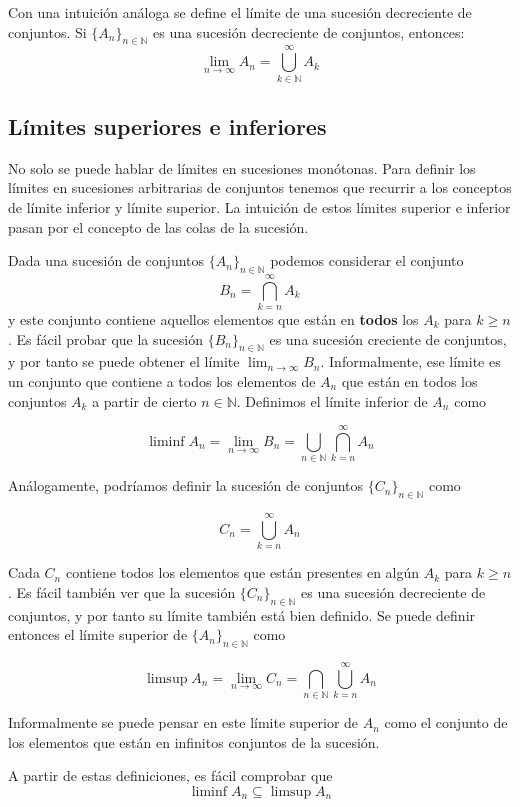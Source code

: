 \documentclass[12pt,a4paper,openright]{book}
\begin{document}
Con una intuición análoga se define el límite de una sucesión decreciente de conjuntos. Si $\{A_n\}_{n\in\mathbb{N}}$ es una sucesión decreciente de conjuntos, entonces:
$$ \lim_{n\to\infty} A_n = \bigcup_{k\in\mathbb{N}}^{\infty} A_k $$

\subsection{Límites superiores e inferiores}
No solo se puede hablar de límites en sucesiones monótonas. Para definir los límites en sucesiones arbitrarias de conjuntos tenemos que recurrir a los conceptos de límite inferior y límite superior. La intuición de estos límites superior e inferior pasan por el concepto de las colas de la sucesión.

Dada una sucesión de conjuntos $\{A_n\}_{n\in\mathbb{N} }$ podemos considerar el conjunto
$$ B_n = \bigcap_{k=n}^{\infty} A_k $$ 
 y este conjunto contiene aquellos elementos que están en \textbf{todos} los $A_k$ para $k \geq n$. Es fácil probar que la sucesión $\{B_n\}_{n\in\mathbb{N}}$ es una sucesión creciente de conjuntos, y por tanto se puede obtener el límite $\lim_{n\to\infty} B_n$. Informalmente, ese límite es un conjunto que contiene a todos los elementos de $A_n$ que están en todos los conjuntos $A_k$ a partir de cierto $n\in\mathbb{N}$. Definimos el límite inferior de $A_n$ como

 $$ \liminf A_n = \lim_{n\to\infty} B_n = \bigcup_{n\in\mathbb{N}} \bigcap_{k=n}^{\infty} A_n $$

 Análogamente, podríamos definir la sucesión de conjuntos $\{C_n\}_{n\in\mathbb{N}}$ como

 $$ C_n = \bigcup_{k=n}^{\infty} A_n $$

Cada $C_n$ contiene todos los elementos que están presentes en algún $A_k$ para $k \geq n$. Es fácil también ver que la sucesión $\{C_n\}_{n\in\mathbb{N}}$ es una sucesión decreciente de conjuntos, y por tanto su límite también está bien definido. Se puede definir entonces el límite superior de $\{A_n\}_{n\in\mathbb{N}}$
como 

$$ \limsup A_n = \lim_{n\to\infty} C_n = \bigcap_{n\in\mathbb{N}} \bigcup_{k=n}^{\infty} A_n $$

Informalmente se puede pensar en este límite superior de $A_n$ como el conjunto de los elementos que están en infinitos conjuntos de la sucesión.

A partir de estas definiciones, es fácil comprobar que 
$$ \liminf A_n \subseteq \limsup A_n $$
\end{document}
